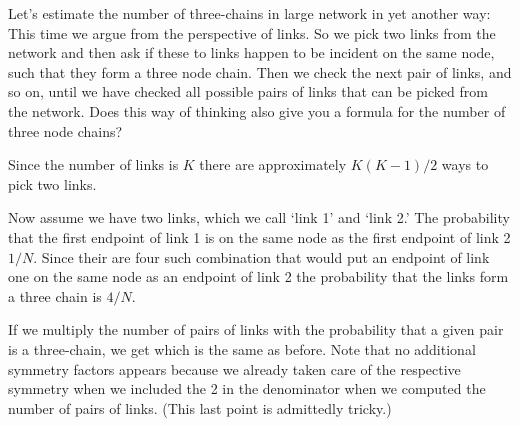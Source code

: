 Let's estimate the number of three-chains in large network in yet another way:
This time we argue from the perspective of links. So we pick two links from the network and then ask if these to links happen to be incident on the same node, such that they form a three node chain. Then we check the next pair of links, and so on, until we have checked all possible pairs of links that can be picked from the network. Does this way of thinking also give you a formula for the number of three node chains?   

\solution
Since the number of links is $K$ there are approximately $K(K-1)/2$ ways to pick two links. 

Now assume we have two links, which we call `link 1' and `link 2.' The probability that the first endpoint of link 1 is on the same node as the first endpoint of link 2 $1/N$. Since their are four such combination that would put an endpoint of link one on the same node as an endpoint of link 2 the probability that the links form a three chain is $4/N$. 

If we multiply the number of pairs of links with the probability that a given pair is a three-chain, we get
which is the same as before. Note that no additional symmetry factors appears because we already taken care of the respective symmetry when we included the 2 in the denominator when we computed the number of pairs of links. (This last point is admittedly tricky.)